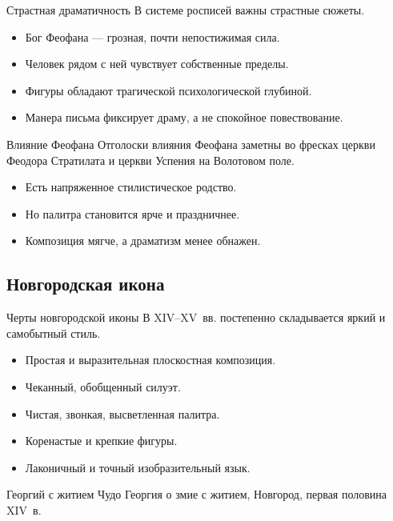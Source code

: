 \begin{frame}{Страстная драматичность}
  В системе росписей важны страстные сюжеты.

  \begin{itemize}
    \item Бог Феофана --- грозная, почти непостижимая сила.
    \item Человек рядом с ней чувствует собственные пределы.
    \item Фигуры обладают трагической психологической глубиной.
    \item Манера письма фиксирует драму, а не спокойное повествование.
  \end{itemize}
\end{frame}

\begin{frame}{Влияние Феофана}
  Отголоски влияния Феофана заметны во фресках церкви Феодора
  Стратилата и церкви Успения на Волотовом поле.

  \begin{itemize}
    \item Есть напряженное стилистическое родство.
    \item Но палитра становится ярче и праздничнее.
    \item Композиция мягче, а драматизм менее обнажен.
  \end{itemize}
\end{frame}

\subsection{Новгородская икона}

\begin{frame}{Черты новгородской иконы}
  В XIV--XV~вв. постепенно складывается яркий и самобытный стиль.

  \begin{itemize}
    \item Простая и выразительная плоскостная композиция.
    \item Чеканный, обобщенный силуэт.
    \item Чистая, звонкая, высветленная палитра.
    \item Коренастые и крепкие фигуры.
    \item Лаконичный и точный изобразительный язык.
  \end{itemize}
\end{frame}

\begin{frame}{Георгий с житием}
    {Чудо Георгия о змие с житием,
     Новгород, первая половина XIV~в.}
\end{frame}

